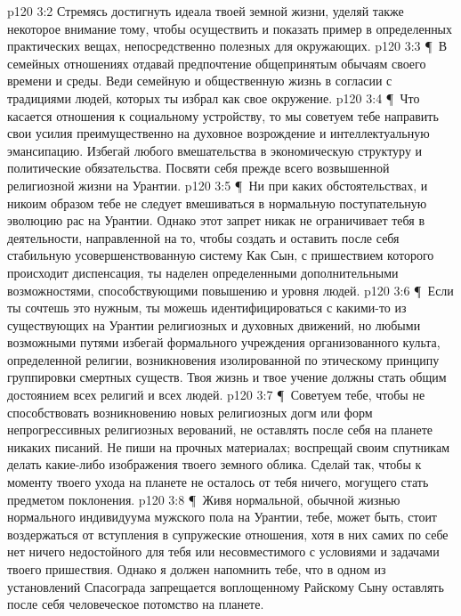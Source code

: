 \vs p120 3:2 \bibnobreakspace Стремясь достигнуть идеала твоей земной жизни, уделяй также некоторое внимание тому, чтобы осуществить и показать пример в определенных практических вещах, непосредственно полезных для окружающих.
\vs p120 3:3 \P\ \bibnobreakspace В семейных отношениях отдавай предпочтение общепринятым обычаям своего времени и среды. Веди семейную и общественную жизнь в согласии с традициями людей, которых ты избрал как свое окружение.
\vs p120 3:4 \P\ \bibnobreakspace Что касается отношения к социальному устройству, то мы советуем тебе направить свои усилия преимущественно на духовное возрождение и интеллектуальную эмансипацию. Избегай любого вмешательства в экономическую структуру и политические обязательства. Посвяти себя прежде всего возвышенной религиозной жизни на Урантии.
\vs p120 3:5 \P\ \bibnobreakspace Ни при каких обстоятельствах, и никоим образом тебе не следует вмешиваться в нормальную поступательную эволюцию рас на Урантии. Однако этот запрет никак не ограничивает тебя в деятельности, направленной на то, чтобы создать и оставить после себя стабильную усовершенствованную систему  Как Сын, с пришествием которого происходит диспенсация, ты наделен определенными дополнительными возможностями, способствующими повышению  и  уровня людей.
\vs p120 3:6 \P\ \bibnobreakspace Если ты сочтешь это нужным, ты можешь идентифицироваться с какими\hyp{}то из существующих на Урантии религиозных и духовных движений, но любыми возможными путями избегай формального учреждения организованного культа, определенной религии, возникновения изолированной по этическому принципу группировки смертных существ. Твоя жизнь и твое учение должны стать общим достоянием всех религий и всех людей.
\vs p120 3:7 \P\ \bibnobreakspace Советуем тебе, чтобы не способствовать возникновению новых религиозных догм или форм непрогрессивных религиозных верований, не оставлять после себя на планете никаких писаний. Не пиши на прочных материалах; воспрещай своим спутникам делать какие\hyp{}либо изображения твоего земного облика. Сделай так, чтобы к моменту твоего ухода на планете не осталось от тебя ничего, могущего стать предметом поклонения.
\vs p120 3:8 \P\ \bibnobreakspace Живя нормальной, обычной жизнью нормального индивидуума мужского пола на Урантии, тебе, может быть, стоит воздержаться от вступления в супружеские отношения, хотя в них самих по себе нет ничего недостойного для тебя или несовместимого с условиями и задачами твоего пришествия. Однако я должен напомнить тебе, что в одном из установлений Спасограда запрещается воплощенному Райскому Сыну оставлять после себя человеческое потомство на планете.
